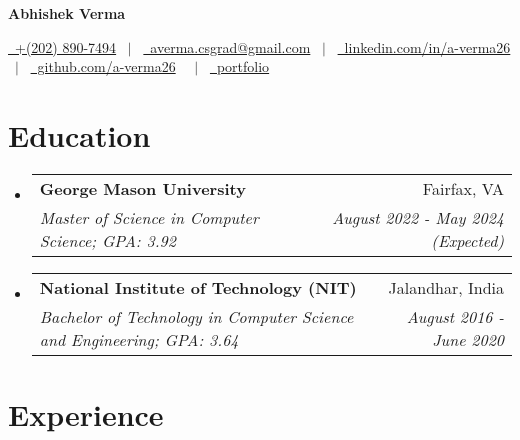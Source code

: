 \documentclass[letterpaper,10.8pt]{article}
\makeatletter
\newcommand{\resumeSubheading}[4]{
  \vspace{-1pt}\item
    \begin{tabular*}{0.97\textwidth}{l@{\extracolsep{\fill}}r}
      \textbf{#1} & #2 \\
      \textit{\small#3} & \textit{\small #4} \\
    \end{tabular*}\vspace{-5pt}
}
\newcommand{\resumeSubHeadingListStart}{\begin{itemize}[leftmargin=*]}
\newcommand{\resumeSubHeadingListEnd}{\end{itemize}}
\makeatother
\begin{document}



\begin{center}
\textbf{\fontsize{16}{28}\selectfont Abhishek Verma}
\end{center}

\begin{center}

\href{tel:+2028907494} 
{\raisebox{-0.05\height}\faPhone\ +(202) 890-7494} \ $|$ \
\href{mailto:averma.csgrad@gmail.com}
{\raisebox{-0.05\height}\faEnvelope \ averma.csgrad@gmail.com} \
$|$ \
\href{https://www.linkedin.com/in/a-verma26/}{\raisebox{-0.05\height}\faLinkedin\ linkedin.com/in/a-verma26} \ $|$ \
\href{https://github.com/a-verma26}{\raisebox{-0.05\height}\faGithub\ github.com/a-verma26} \ 
\ $|$ \
\href{https://abhishek-portfolio-orpin.vercel.app/}{\raisebox{-0.05\height}\faUser\ portfolio} \ 
\end{center}



\section{Education}

  \resumeSubHeadingListStart

    \resumeSubheading
      {George Mason University}{Fairfax, VA}
      {Master of Science in Computer Science;  GPA: 3.92}{August 2022 - May 2024 (Expected)}
       


	    \vspace{2pt}
    \resumeSubheading
      {National Institute of Technology (NIT)}{Jalandhar, India}
      {Bachelor of Technology in Computer Science and Engineering;   GPA: 3.64 }{August 2016 - June 2020}

      
  \resumeSubHeadingListEnd



\section{Experience}
\end{document}
